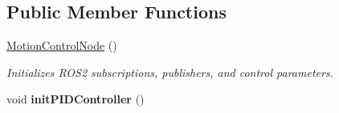 \subsection*{Public Member Functions}
\begin{DoxyCompactItemize}
\item 
\hyperlink{classMotionControlNode_a2d6c4f671ad827ffce0379d8c704ffb3}{Motion\+Control\+Node} ()
\begin{DoxyCompactList}\small\item\em Initializes R\+O\+S2 subscriptions, publishers, and control parameters. \end{DoxyCompactList}\item 
\mbox{\label{classMotionControlNode_ad1497ac89b446c40635e05da0313b922}} 
void {\bfseries init\+P\+I\+D\+Controller} ()
\end{DoxyCompactItemize}
